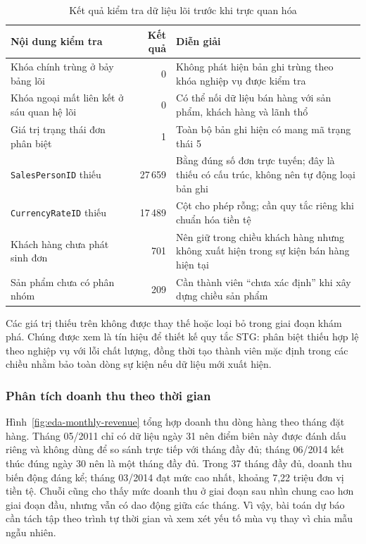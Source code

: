 \begin{table}[H]\centering
\caption{Kết quả kiểm tra dữ liệu lõi trước khi trực quan hóa}
\label{tab:eda-quality-checks}
\begin{tabularx}{\textwidth}{|X|r|X|}\hline
\textbf{Nội dung kiểm tra} & \textbf{Kết quả} & \textbf{Diễn giải} \\ \hline
Khóa chính trùng ở bảy bảng lõi & 0 & Không phát hiện bản ghi trùng theo khóa nghiệp vụ được kiểm tra \\ \hline
Khóa ngoại mất liên kết ở sáu quan hệ lõi & 0 & Có thể nối dữ liệu bán hàng với sản phẩm, khách hàng và lãnh thổ \\ \hline
Giá trị trạng thái đơn phân biệt & 1 & Toàn bộ bản ghi hiện có mang mã trạng thái 5 \\ \hline
\texttt{SalesPersonID} thiếu & 27\,659 & Bằng đúng số đơn trực tuyến; đây là thiếu có cấu trúc, không nên tự động loại bản ghi \\ \hline
\texttt{CurrencyRateID} thiếu & 17\,489 & Cột cho phép rỗng; cần quy tắc riêng khi chuẩn hóa tiền tệ \\ \hline
Khách hàng chưa phát sinh đơn & 701 & Nên giữ trong chiều khách hàng nhưng không xuất hiện trong sự kiện bán hàng hiện tại \\ \hline
Sản phẩm chưa có phân nhóm & 209 & Cần thành viên ``chưa xác định'' khi xây dựng chiều sản phẩm \\ \hline
\end{tabularx}
\end{table}

Các giá trị thiếu trên không được thay thế hoặc loại bỏ trong giai đoạn khám phá. Chúng được xem là tín hiệu để thiết kế quy tắc STG: phân biệt thiếu hợp lệ theo nghiệp vụ với lỗi chất lượng, đồng thời tạo thành viên mặc định trong các chiều nhằm bảo toàn dòng sự kiện nếu dữ liệu mới xuất hiện.

\subsubsection{Phân tích doanh thu theo thời gian}

Hình~\ref{fig:eda-monthly-revenue} tổng hợp doanh thu dòng hàng theo tháng đặt hàng. Tháng 05/2011 chỉ có dữ liệu ngày 31 nên điểm biên này được đánh dấu riêng và không dùng để so sánh trực tiếp với tháng đầy đủ; tháng 06/2014 kết thúc đúng ngày 30 nên là một tháng đầy đủ. Trong 37 tháng đầy đủ, doanh thu biến động đáng kể; tháng 03/2014 đạt mức cao nhất, khoảng 7,22 triệu đơn vị tiền tệ. Chuỗi cũng cho thấy mức doanh thu ở giai đoạn sau nhìn chung cao hơn giai đoạn đầu, nhưng vẫn có dao động giữa các tháng. Vì vậy, bài toán dự báo cần tách tập theo trình tự thời gian và xem xét yếu tố mùa vụ thay vì chia mẫu ngẫu nhiên.

